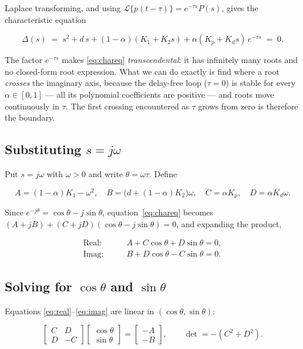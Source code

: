 \documentclass[11pt,a4paper]{article}
\theoremstyle{plain}
\theoremstyle{definition}
\begin{document}
Laplace transforming, and using
$\mathcal{L}\{p(t-\tau)\} = e^{-\tau s}P(s)$, gives the characteristic
equation

\begin{equation}
\boxed{\;
\Delta(s) \;=\; s^{2} + d\,s + (1-\alpha)(K_1 + K_2 s)
+ \alpha (K_p + K_d s)\,e^{-\tau s} \;=\; 0. \;}
\label{eq:chareq}
\end{equation}

The factor $e^{-\tau s}$ makes \eqref{eq:chareq} \emph{transcendental}:
it has infinitely many roots and no closed-form root expression. What we
can do exactly is find where a root \emph{crosses} the imaginary axis,
because the delay-free loop ($\tau = 0$) is stable for every
$\alpha \in [0,1]$ --- all its polynomial coefficients are positive ---
and roots move continuously in $\tau$. The first crossing encountered as
$\tau$ grows from zero is therefore the boundary.

\subsection{Substituting \texorpdfstring{$s = j\omega$}{s = j omega}}

Put $s = j\omega$ with $\omega > 0$ and write $\theta = \omega\tau$.
Define

\begin{equation}
A = (1-\alpha)K_1 - \omega^{2},
\quad
B = \bigl(d + (1-\alpha)K_2\bigr)\omega,
\quad
C = \alpha K_p,
\quad
D = \alpha K_d \omega .
\label{eq:ABCD}
\end{equation}

Since $e^{-j\theta} = \cos\theta - j\sin\theta$,
equation~\eqref{eq:chareq} becomes
$(A + jB) + (C + jD)(\cos\theta - j\sin\theta) = 0$, and expanding the
product,

\begin{align}
\text{Real:}&\qquad A + C\cos\theta + D\sin\theta = 0, \label{eq:real}\\
\text{Imag:}&\qquad B + D\cos\theta - C\sin\theta = 0. \label{eq:imag}
\end{align}

\subsection{Solving for \texorpdfstring{$\cos\theta$ and $\sin\theta$}{cos theta and sin theta}}

Equations \eqref{eq:real}--\eqref{eq:imag} are linear in
$(\cos\theta, \sin\theta)$:

\begin{equation}
\begin{bmatrix} C & D \\ D & -C \end{bmatrix}
\begin{bmatrix} \cos\theta \\ \sin\theta \end{bmatrix}
=
\begin{bmatrix} -A \\ -B \end{bmatrix},
\qquad
\det = -(C^2 + D^2).
\end{equation}
\end{document}
